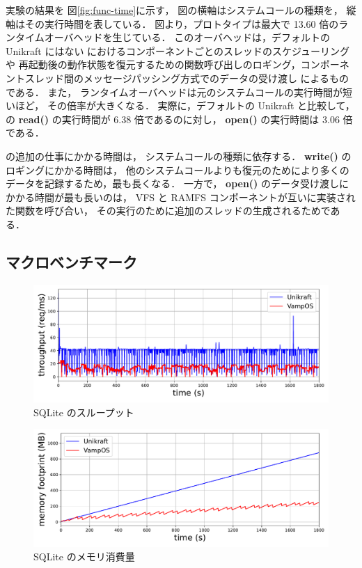 実験の結果を
図\ref{fig:func-time}に示す，
図の横軸はシステムコールの種類を，
縦軸はその実行時間を表している．
図より，プロトタイプは最大で 13.60 倍のランタイムオーバヘッドを生じている．
このオーバヘッドは，デフォルトの Unikraft にはない \sysname におけるコンポーネントごとのスレッドのスケジューリングや
再起動後の動作状態を復元するための関数呼び出しのロギング，コンポーネントスレッド間のメッセージパッシング方式でのデータの受け渡し
によるものである．
また，
ランタイムオーバヘッドは元のシステムコールの実行時間が短いほど，
その倍率が大きくなる．
実際に，デフォルトの Unikraft と比較して，
\sysname の \textbf{read()} の実行時間が 6.38 倍であるのに対し，
\textbf{open()} の実行時間は 3.06 倍である．

\sysname の追加の仕事にかかる時間は，
システムコールの種類に依存する．
\textbf{write()} のロギングにかかる時間は，
他のシステムコールよりも復元のためにより多くのデータを記録するため，最も長くなる．
一方で，
\textbf{open()} のデータ受け渡しにかかる時間が最も長いのは，
VFS と RAMFS コンポーネントが互いに実装された関数を呼び合い，
その実行のために追加のスレッドの生成されるためである．


\subsection{マクロベンチマーク}

\begin{figure}[!t]
    \centering
    \includegraphics[width=\linewidth]{img/SQLite-perf.pdf}
    \caption{SQLite のスループット}
    \label{fig:sqlite-perf}
\end{figure}

\begin{figure}[!t]
    \centering
    \includegraphics[width=\linewidth]{img/SQLite-mem.pdf}
    \caption{SQLite のメモリ消費量}
    \label{fig:sqlite-mem}
\end{figure}

